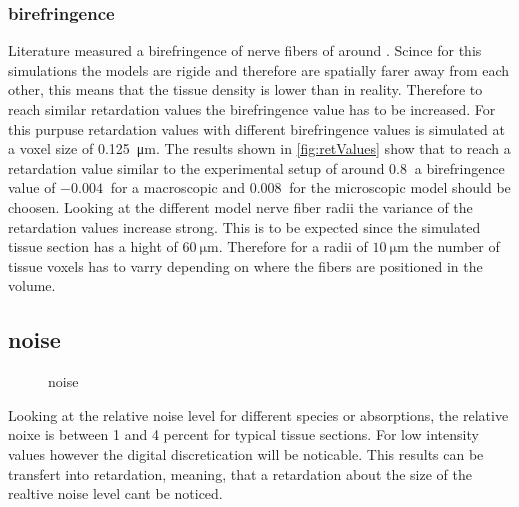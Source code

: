 \subsubsection{birefringence}
% 
Literature measured a birefringence of nerve fibers of around \dummy{}. 
Scince for this simulations the models are rigide and therefore are spatially farer away from each other, this means that the tissue density is lower than in reality.
Therefore to reach similar retardation values the birefringence value has to be increased.
For this purpuse retardation values with different birefringence values is simulated at a voxel size of \SI{0.125}{\micro\meter}.
The results shown in \cref{fig:retValues} show that to reach a retardation value similar to the experimental setup of around $\SI{0.8}{}$ a birefringence value of $\SI{-0.004}{}$ for a macroscopic and $\SI{0.008}{}$ for the microscopic model should be choosen.
Looking at the different model nerve fiber radii the variance of the retardation values increase strong.
This is to be expected since the simulated tissue section has a hight of $\SI{60}{\micro\meter}$.
Therefore for a radii of $\SI{10}{\micro\meter}$ the number of tissue voxels has to varry depending on where the fibers are positioned in the volume.
% 
% 
% 
% 
\subsection{noise}
% 
\begin{figure}[!t]
\centering
% 
% 
\caption[noise plot]{noise \dummy{}}
\label{fig:noiseplot}
\end{figure}
% 
Looking at the relative noise level for different species or absorptions, the relative noixe is between 1 and 4 percent for typical tissue sections.
For low intensity values however the digital discretication will be noticable.
This results can be transfert into retardation, meaning, that a retardation about the size of the realtive noise level cant be noticed.
% 
% 
% 
